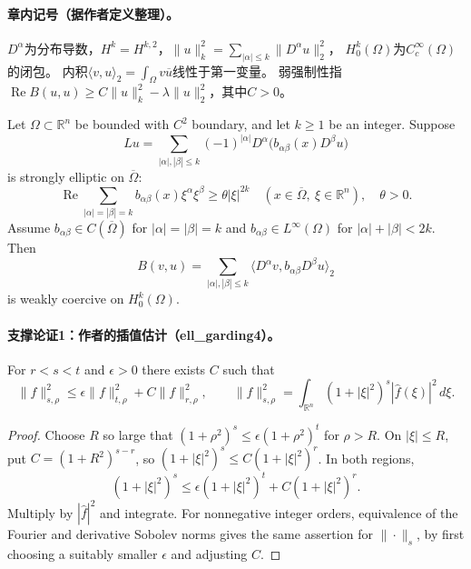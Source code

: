 
\paragraph{章内记号（据作者定义整理）。}
$D^\alpha$为分布导数，$H^k=H^{k,2}$，$\|u\|_k^2=\sum_{|\alpha|\leq k}\|D^\alpha u\|_2^2$，
$H^k_0(\Omega)$为$C_c^\infty(\Omega)$的闭包。
内积$\langle v,u\rangle_2=\int_\Omega v\overline u$线性于第一变量。
弱强制性指$\operatorname{Re}B(u,u)\geq C\|u\|_k^2-\lambda\|u\|_2^2$，其中$C>0$。
\begin{theorem}
Let $\Omega\subset\mathbb R^n$ be bounded with $C^2$ boundary, and let
$k\geq1$ be an integer. Suppose
\[
Lu=\sum_{|\alpha|,|\beta|\leq k}(-1)^{|\alpha|}
D^\alpha\bigl(b_{\alpha\beta}(x)D^\beta u\bigr)
\]
is strongly elliptic on $\overline\Omega$:
\[
\operatorname{Re}\sum_{|\alpha|=|\beta|=k}b_{\alpha\beta}(x)\xi^\alpha\xi^\beta
\geq\theta|\xi|^{2k}\quad(x\in\overline\Omega,\ \xi\in\mathbb R^n),\quad\theta>0.
\]
Assume $b_{\alpha\beta}\in C(\overline\Omega)$ for $|\alpha|=|\beta|=k$
and $b_{\alpha\beta}\in L^\infty(\Omega)$ for $|\alpha|+|\beta|<2k$.
Then
\[
B(v,u)=\sum_{|\alpha|,|\beta|\leq k}
\langle D^\alpha v,b_{\alpha\beta}D^\beta u\rangle_2
\]
is weakly coercive on $H^k_0(\Omega)$.
\end{theorem}
\paragraph{支撑论证1：作者的插值估计（ell\_garding4）。}
For $r<s<t$ and $\epsilon>0$ there exists $C$ such that
\[
\|f\|_{s,\rho}^2\leq\epsilon\|f\|_{t,\rho}^2+C\|f\|_{r,\rho}^2,
\qquad \|f\|_{s,\rho}^2=\int_{\mathbb R^n}(1+|\xi|^2)^s|\widehat f(\xi)|^2\,d\xi.
\]
\begin{proof}
Choose $R$ so large that $(1+\rho^2)^s\leq\epsilon(1+\rho^2)^t$ for
$\rho>R$. On $|\xi|\leq R$, put $C=(1+R^2)^{s-r}$, so
$(1+|\xi|^2)^s\leq C(1+|\xi|^2)^r$.
In both regions,
\[
(1+|\xi|^2)^s\leq\epsilon(1+|\xi|^2)^t+C(1+|\xi|^2)^r.
\]
Multiply by $|\widehat f|^2$ and integrate. For nonnegative integer
orders, equivalence of the Fourier and derivative Sobolev norms gives
the same assertion for $\|\cdot\|_s$, by first choosing a suitably
smaller $\epsilon$ and adjusting $C$.
\end{proof}

